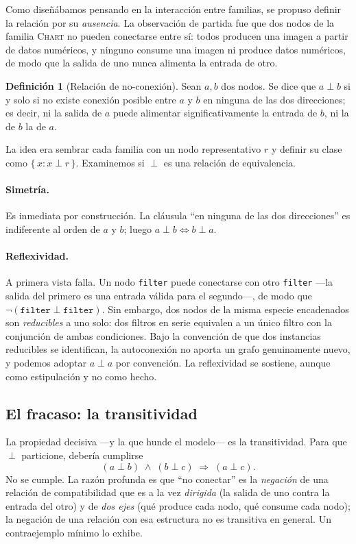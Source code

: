 \documentclass[11pt,a4paper]{article}
\theoremstyle{definition}
\newtheorem{definicion}{Definición}[section]
\theoremstyle{plain}
\newcommand{\mundo}[1]{\textsc{#1}}   %
\begin{document}
Como diseñábamos pensando en la interacción entre familias, se propuso definir la
relación por su \emph{ausencia}. La observación de partida fue que dos nodos de la
familia \mundo{Chart} no pueden conectarse entre sí: todos producen una imagen a
partir de datos numéricos, y ninguno consume una imagen ni produce datos numéricos,
de modo que la salida de uno nunca alimenta la entrada de otro.

\begin{definicion}[Relación de no-conexión]
Sean $a,b$ dos nodos. Se dice que $a \perp b$ si y solo si no existe conexión
posible entre $a$ y $b$ en ninguna de las dos direcciones; es decir, ni la salida
de $a$ puede alimentar significativamente la entrada de $b$, ni la de $b$ la de
$a$.
\end{definicion}

La idea era sembrar cada familia con un nodo representativo $r$ y definir su clase
como $\{\,x : x \perp r\,\}$. Examinemos si $\perp$ es una relación de equivalencia.

\paragraph{Simetría.} Es inmediata por construcción. La cláusula ``en ninguna de
las dos direcciones'' es indiferente al orden de $a$ y $b$; luego
$a \perp b \iff b \perp a$.

\paragraph{Reflexividad.} A primera vista falla. Un nodo \texttt{filter} puede
conectarse con otro \texttt{filter} ---la salida del primero es una entrada válida
para el segundo---, de modo que $\lnot(\texttt{filter} \perp \texttt{filter})$. Sin
embargo, dos nodos de la misma especie encadenados son \emph{reducibles} a uno
solo: dos filtros en serie equivalen a un único filtro con la conjunción de ambas
condiciones. Bajo la convención de que dos instancias reducibles se identifican, la
autoconexión no aporta un grafo genuinamente nuevo, y podemos adoptar
$a \perp a$ por convención. La reflexividad se sostiene, aunque como estipulación y
no como hecho.

\subsection{El fracaso: la transitividad}

La propiedad decisiva ---y la que hunde el modelo--- es la transitividad. Para que
$\perp$ particione, debería cumplirse
\[
  (a \perp b) \;\wedge\; (b \perp c) \;\Longrightarrow\; (a \perp c).
\]
No se cumple. La razón profunda es que ``no conectar'' es la \emph{negación} de una
relación de compatibilidad que es a la vez \emph{dirigida} (la salida de uno contra
la entrada del otro) y de \emph{dos ejes} (qué produce cada nodo, qué consume cada
nodo); la negación de una relación con esa estructura no es transitiva en general.
Un contraejemplo mínimo lo exhibe.
\end{document}
